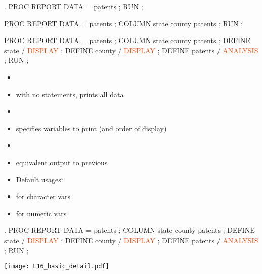 \begin{frame}[fragile]
\hspace{-0.3in}
\begin{code}{.}
PROC REPORT DATA = patents ;
RUN ;


PROC REPORT DATA = patents ;
   COLUMN state county patents ;
RUN ;


PROC REPORT DATA = patents ;
   COLUMN state county patents ;
   DEFINE state / \textcolor{OrangeRed}{DISPLAY} ;
   DEFINE county / \textcolor{OrangeRed}{DISPLAY} ;
   DEFINE patents / \textcolor{OrangeRed}{ANALYSIS} ;
RUN ;
\end{code}
\emp
{}
\begin{itemize}
\item[]
\item with no statements, prints all data
\item[]
\item {} specifies variables to print (and order of display)
\item[]
\item equivalent output to previous 
\item Default usages:
\item[]  for character vars
\item[]  for numeric vars
\end{itemize}
\emp
\end{frame}



\begin{frame}[fragile]
\hspace{-0.3in}
\begin{code}{.}
PROC REPORT DATA = patents ;
   COLUMN state county patents ;
   DEFINE state / \textcolor{OrangeRed}{DISPLAY} ;
   DEFINE county / \textcolor{OrangeRed}{DISPLAY} ;
   DEFINE patents / \textcolor{OrangeRed}{ANALYSIS} ;
RUN ;
\end{code}
\emp
\blankcolumn
{}
\texttt{[image: L16\_basic\_detail.pdf]}
\emp
\end{frame}

